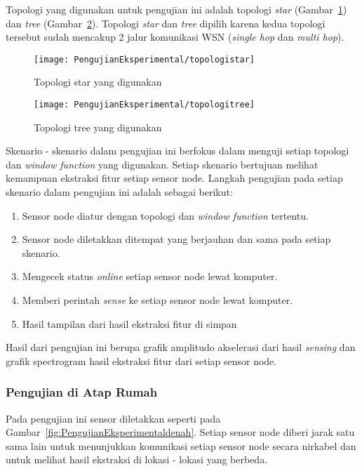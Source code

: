 Topologi yang digunakan untuk pengujian ini adalah topologi {\it star} (Gambar~\ref{fig:PengujianEksperimentaltopologistar}) dan {\it tree} (Gambar~\ref{fig:PengujianEksperimentaltopologitree}). Topologi {\it star} dan {\it tree} dipilih karena kedua topologi tersebut sudah mencakup 2 jalur komunikasi WSN ({\it single hop} dan {\it multi hop}).

\begin{figure}[H]
	\centering
	\texttt{[image: PengujianEksperimental/topologistar]}  
	\caption[Topologi star yang digunakan]{Topologi star yang digunakan} 
	\label{fig:PengujianEksperimentaltopologistar} 
\end{figure}

\begin{figure}[H]
	\centering
	\texttt{[image: PengujianEksperimental/topologitree]}  
	\caption[Topologi tree yang digunakan]{Topologi tree yang digunakan} 
	\label{fig:PengujianEksperimentaltopologitree} 
\end{figure}

Skenario - skenario dalam pengujian ini berfokus dalam menguji setiap topologi dan {\it window function} yang digunakan. Setiap skenario bertujuan melihat kemampuan ekstraksi fitur setiap sensor node. Langkah pengujian pada setiap skenario dalam pengujian ini adalah sebagai berikut:
\begin{enumerate}
	\item Sensor node diatur dengan topologi dan {\it window function} tertentu.
	\item Sensor node diletakkan ditempat yang berjauhan dan sama pada setiap skenario.
	\item Mengecek status {\it online} setiap sensor node lewat komputer.
	\item Memberi perintah {\it sense} ke setiap sensor node lewat komputer.
	\item Hasil tampilan dari hasil ekstraksi fitur di simpan 
\end{enumerate}
Hasil dari pengujian ini berupa grafik amplitudo akselerasi dari hasil {\it sensing} dan grafik spectrogram hasil ekstraksi fitur dari setiap sensor node.  

\subsubsection{Pengujian di Atap Rumah}
Pada pengujian ini sensor diletakkan seperti pada Gambar~\ref{fig:PengujianEksperimentaldenah}. Setiap sensor node diberi jarak satu sama lain untuk menunjukkan komunikasi setiap sensor node secara nirkabel dan untuk melihat hasil ekstraksi di lokasi - lokasi yang berbeda. 

